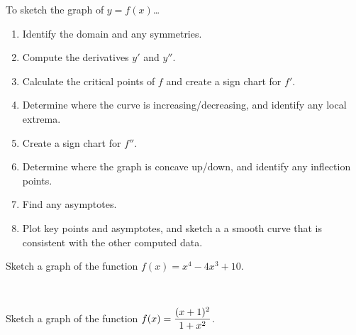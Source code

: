 \begin{remark}
To sketch the graph of $y=f(x)$\dots
\begin{enumerate}
\item Identify the domain and any symmetries.
\item Compute the derivatives $y'$ and $y''$.
\item Calculate the critical points of $f$ and create a sign chart for $f'$.
\item Determine where the curve is increasing/decreasing, and identify any local extrema.
\item Create a sign chart for $f''$.
\item Determine where the graph is concave up/down, and identify any inflection points.
\item Find any asymptotes.
\item Plot key points and asymptotes, and sketch a a smooth curve that is consistent with the other computed data.
\end{enumerate}
\end{remark}

\newpage

\begin{example}
Sketch a graph of the function $f(x) = x^4-4x^3+10$.
\end{example}

\newpage\ 
\newpage

\begin{example}
Sketch a graph of the function $f(x) =\displaystyle \frac{(x+1)^2}{1+x^2}$.
\end{example}

\newpage\ 
